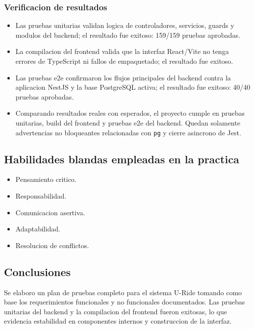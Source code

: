 \documentclass{article}
\begin{document}
\subsubsection{Verificacion de resultados}
\begin{itemize}[leftmargin=*]
    \item Las pruebas unitarias validan logica de controladores, servicios, guards y modulos del backend; el resultado fue exitoso: 159/159 pruebas aprobadas.
    \item La compilacion del frontend valida que la interfaz React/Vite no tenga errores de TypeScript ni fallos de empaquetado; el resultado fue exitoso.
    \item Las pruebas e2e confirmaron los flujos principales del backend contra la aplicacion NestJS y la base PostgreSQL activa; el resultado fue exitoso: 40/40 pruebas aprobadas.
    \item Comparando resultados reales con esperados, el proyecto cumple en pruebas unitarias, build del frontend y pruebas e2e del backend. Quedan solamente advertencias no bloqueantes relacionadas con \texttt{pg} y cierre asincrono de Jest.
\end{itemize}

\subsection{Habilidades blandas empleadas en la practica}
\begin{itemize}[leftmargin=*]
    \item[$\checkmark$] Pensamiento critico.
    \item[$\checkmark$] Responsabilidad.
    \item[$\checkmark$] Comunicacion asertiva.
    \item[$\checkmark$] Adaptabilidad.
    \item[$\checkmark$] Resolucion de conflictos.
\end{itemize}

\subsection{Conclusiones}
Se elaboro un plan de pruebas completo para el sistema U-Ride tomando como base los requerimientos funcionales y no funcionales documentados. Las pruebas unitarias del backend y la compilacion del frontend fueron exitosas, lo que evidencia estabilidad en componentes internos y construccion de la interfaz.
\end{document}
